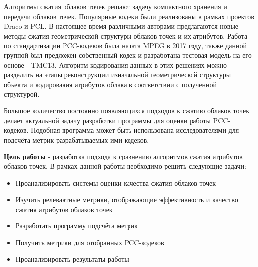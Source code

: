 Алгоритмы сжатия облаков точек решают задачу компактного хранения и передачи
облаков точек. Популярные кодеки были реализованы в рамках проектов
Draco\cite{Draco} и PCL\cite{Rusu_ICRA2011_PCL}. В настоящее время различными
авторами предлагаются новые методы сжатия геометрической структуры облаков
точек\cite{PCGCv2}\cite{GeoCNNv2} и их
атрибутов\cite{Shao2017}\cite{Chen2020}\cite{Sun2023}. Работа по стандартизации
PCC-кодеков была начата MPEG в 2017 году\cite{CallForProposalV2}, также данной
группой был предложен собственный кодек и разработана тестовая модель на его
основе - TMC13\cite{TMC13}. Алгоритм кодирования данных в этих решениях можно
разделить на этапы реконструкции изначальной геометрической структуры объекта и
кодирования атрибутов облака в соответствии с полученной структурой.

Большое количество постоянно появляющихся подходов к сжатию облаков точек делает
актуальной задачу разработки программы для оценки работы PCC-кодеков. Подобная
программа может быть использована исследователями для подсчёта метрик
разрабатываемых ими кодеков.

\textbf{Цель работы} - разработка подхода к сравнению алгоритмов сжатия
атрибутов облаков точек. В рамках данной работы необходимо решить следующие
задачи:

\begin{itemize}
    \item Проанализировать системы оценки качества сжатия облаков точек
    \item Изучить релевантные метрики, отображающие эффективность и качество
    сжатия атрибутов облаков точек
    \item Разработать программу подсчёта метрик
    \item Получить метрики для отобранных PCC-кодеков
    \item Проанализировать результаты работы
\end{itemize}


